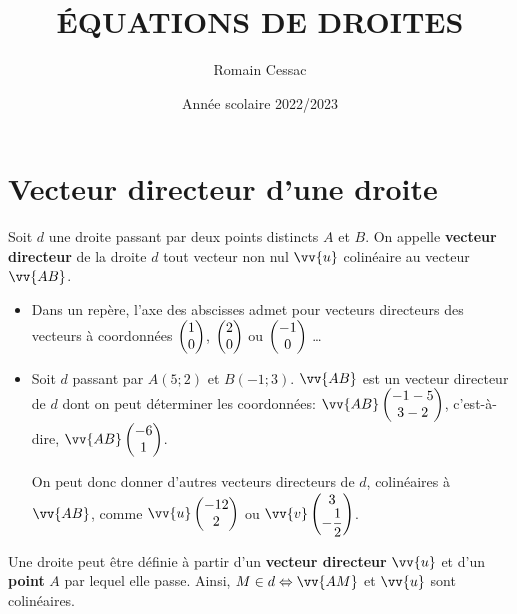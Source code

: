 \documentclass[cours,couleur]{mathsRC}
\author{Romain Cessac}
\title{ÉQUATIONS DE DROITES}
\date{Année scolaire 2022/2023}
\begin{document}
\maketitle
\section{Vecteur directeur d'une droite}

\begin{definition}
Soit $d$ une droite passant par deux points distincts $A$ et $B$. On appelle \textbf{vecteur directeur} de la droite $d$ tout vecteur non nul $\vv{u}$ colinéaire au vecteur $\vv{AB}$.
\begin{center}
\end{center}
\end{definition}

\begin{exemples}
\begin{itemize}[leftmargin=*]
\item
Dans un repère, l'axe des abscisses admet pour vecteurs directeurs des vecteurs à coordonnées $\begin{pmatrix} 1 \\ 0 \end{pmatrix}$, $\begin{pmatrix} 2 \\ 0 \end{pmatrix}$ ou $\begin{pmatrix} -1 \\ 0 \end{pmatrix}$ \dots
\item
Soit $d$ passant par $A(5;2)$ et $B(-1;3)$. $\vv{AB}$ est un vecteur directeur de $d$ dont on peut déterminer les coordonnées: $\vv{AB}\coorddeux{-1-5}{3-2}$, c'est-à-dire, $\vv{AB}\coorddeux{-6}{1}$.

On peut donc donner d'autres vecteurs directeurs de $d$, colinéaires à $\vv{AB}$, comme $\vv{u}\coorddeux{-12}{2}$ ou $\vv{v}\coorddeux{3}{-\dfrac{1}{2}}$.
\end{itemize}
\end{exemples}

\begin{propriete}
Une droite peut être définie à partir d'un \textbf{vecteur directeur} $\vv{u}$ et d'un \textbf{point} $A$ par lequel elle passe. Ainsi, $M\in d \ssi  \vv{AM}$ et $\vv{u}$ sont colinéaires.
\end{propriete}
\end{document}
